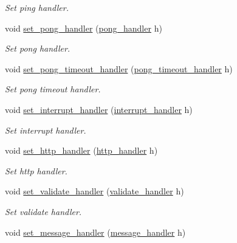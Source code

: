\begin{DoxyCompactItemize}
\begin{DoxyCompactList}\small\item\em Set ping handler. \end{DoxyCompactList}\item 
void \hyperlink{classwebsocketpp_1_1connection_a298795eaa6d554ca5114ff23346d47a9}{set\+\_\+pong\+\_\+handler} (\hyperlink{namespacewebsocketpp_a1798d54e6d98a481cf870091af84bc1f}{pong\+\_\+handler} h)
\begin{DoxyCompactList}\small\item\em Set pong handler. \end{DoxyCompactList}\item 
void \hyperlink{classwebsocketpp_1_1connection_a6baa576fffc7af7685cf75894d634fb7}{set\+\_\+pong\+\_\+timeout\+\_\+handler} (\hyperlink{namespacewebsocketpp_a2c5925a111b9e553efebea35d5ea155f}{pong\+\_\+timeout\+\_\+handler} h)
\begin{DoxyCompactList}\small\item\em Set pong timeout handler. \end{DoxyCompactList}\item 
void \hyperlink{classwebsocketpp_1_1connection_aa8edc6e8ea1b72f84973bed0a20ad365}{set\+\_\+interrupt\+\_\+handler} (\hyperlink{namespacewebsocketpp_a55f6947df7673a9de3c44b6bd5d4a82a}{interrupt\+\_\+handler} h)
\begin{DoxyCompactList}\small\item\em Set interrupt handler. \end{DoxyCompactList}\item 
void \hyperlink{classwebsocketpp_1_1connection_a78c680623660b0442394af6b45c46c23}{set\+\_\+http\+\_\+handler} (\hyperlink{namespacewebsocketpp_a37bc4d5b3b21d3bb494d8a23236315d2}{http\+\_\+handler} h)
\begin{DoxyCompactList}\small\item\em Set http handler. \end{DoxyCompactList}\item 
void \hyperlink{classwebsocketpp_1_1connection_aa28096d051f5639d7b01954845fc054c}{set\+\_\+validate\+\_\+handler} (\hyperlink{namespacewebsocketpp_ae28f3fed86a59b1998746694f3d4edbd}{validate\+\_\+handler} h)
\begin{DoxyCompactList}\small\item\em Set validate handler. \end{DoxyCompactList}\item 
void \hyperlink{classwebsocketpp_1_1connection_a107e754227c828582779b906654743fe}{set\+\_\+message\+\_\+handler} (\hyperlink{classwebsocketpp_1_1connection_a0091551000546d5f5f427379d852cae9}{message\+\_\+handler} h)

\end{DoxyCompactItemize}
